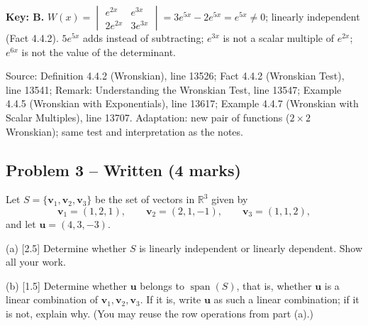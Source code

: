 \documentclass[11pt,a4paper]{article}
\newcommand{\Src}[1]{{\footnotesize\color{black!65}Source: #1}}
\begin{document}
\textbf{Key: B.} $W(x)=\begin{vmatrix}e^{2x}&e^{3x}\\2e^{2x}&3e^{3x}\end{vmatrix}=3e^{5x}-2e^{5x}=e^{5x}\neq0$; linearly independent (Fact 4.4.2). $5e^{5x}$ adds instead of subtracting; $e^{3x}$ is not a scalar multiple of $e^{2x}$; $e^{6x}$ is not the value of the determinant.\par
\Src{Definition 4.4.2 (Wronskian), line 13526; Fact 4.4.2 (Wronskian Test), line 13541; Remark: Understanding the Wronskian Test, line 13547; Example 4.4.5 (Wronskian with Exponentials), line 13617; Example 4.4.7 (Wronskian with Scalar Multiples), line 13707. Adaptation: new pair of functions ($2\times2$ Wronskian); same test and interpretation as the notes.}\par
\subsection*{Problem 3 -- Written (4 marks)}
Let $S=\{\mathbf{v}_1,\mathbf{v}_2,\mathbf{v}_3\}$ be the set of vectors in $\mathbb{R}^3$ given by\[\mathbf{v}_1=(1,2,1),\qquad \mathbf{v}_2=(2,1,-1),\qquad \mathbf{v}_3=(1,1,2),\]and let $\mathbf{u}=(4,3,-3)$.\par (a) [2.5] Determine whether $S$ is linearly independent or linearly dependent. Show all your work.\par (b) [1.5] Determine whether $\mathbf{u}$ belongs to $\operatorname{span}(S)$, that is, whether $\mathbf{u}$ is a linear combination of $\mathbf{v}_1,\mathbf{v}_2,\mathbf{v}_3$. If it is, write $\mathbf{u}$ as such a linear combination; if it is not, explain why. (You may reuse the row operations from part (a).)\par
\end{document}
